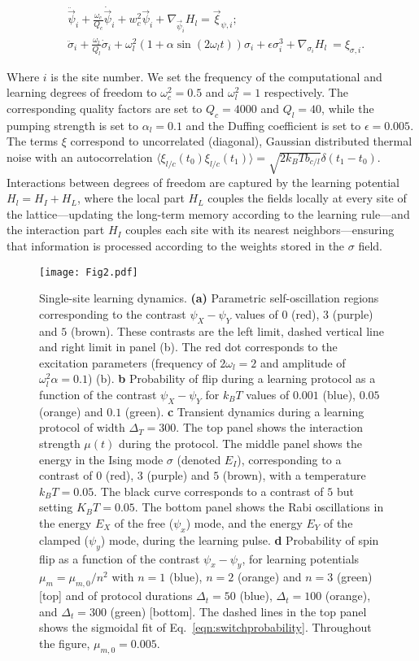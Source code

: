 \begin{align}
&\ddot{\vec{\psi}}_{i} + \frac{\omega_c}{Q_c}\dot{\vec{\psi}}_{i} + w_c^2\vec{\psi}_{i} + \nabla_{\vec{\psi}_i} H_l = \vec{\xi}_{\psi, i};\\
&\ddot{\sigma}_i + \frac{\omega_l}{Q_l}\dot{\sigma}_i + \omega_l^2(1 + \alpha\sin(2\omega_l t))\sigma_i + \epsilon\sigma_i^3 +\nabla_{\sigma_i} H_l \ 
= \xi_{\sigma, i}. \label{eqn:Ising}
\end{align}

Where $i$ is the site number. We set the frequency of the computational and learning degrees of freedom to $\omega_c^2=0.5$ and $\omega_l^2=1$ respectively. The corresponding quality factors are set to $Q_c=4000$ and $Q_l=40$, while the pumping strength is set to $\alpha_l=0.1$ and the Duffing coefficient is set to $\epsilon=0.005$. The terms $\xi$ correspond to uncorrelated (diagonal), Gaussian distributed thermal noise with an autocorrelation $\langle\xi_{l/c}(t_0)\xi_{l/c}(t_1)\rangle = \sqrt{2k_BTb_{c/l}}\delta(t_1-t_0)$. Interactions between degrees of freedom are captured by the learning potential $H_l=H_I+H_L$, where the local part $H_L$ couples the fields locally at every site of the lattice---updating the long-term memory according to the learning rule---and the interaction part $H_I$ couples each site with its nearest neighbors---ensuring that information is processed according to the weights stored in the $\sigma$ field. 

\begin{figure}[t!]
\texttt{[image: Fig2.pdf]}
\caption{\label{fig:flip} Single-site learning dynamics. \textbf{(a)} Parametric self-oscillation regions corresponding to the contrast $\psi_X-\psi_Y$ values of $0$ (red), $3$ (purple) and $5$ (brown). These contrasts are the left limit, dashed vertical line and right limit in panel (b). The red dot corresponds to the excitation parameters (frequency of $2\omega_l=2$ and amplitude of $\omega_l^2\alpha=0.1$) (b). \textbf{b} Probability of flip during a learning protocol as a function of the contrast $\psi_X-\psi_Y$ for $k_BT$ values of $0.001$ (blue), $0.05$ (orange) and $0.1$ (green). \textbf{c} Transient dynamics during a learning protocol of width $\Delta_T=300$. The top panel shows the interaction strength $\mu(t)$ during the protocol. The middle panel shows the energy in the Ising mode $\sigma$ (denoted $E_I$), corresponding to a contrast of $0$ (red), $3$ (purple) and $5$ (brown), with a temperature $k_BT=0.05$. The black curve corresponds to a contrast of $5$ but setting $K_BT=0.05$. The bottom panel shows the Rabi oscillations in the energy $E_X$ of the free ($\psi_x$) mode, and the energy $E_Y$ of the clamped ($\psi_y$) mode, during the learning pulse. \textbf{d} Probability of spin flip as a function of the contrast $\psi_x-\psi_y$, for learning potentials $\mu_m=\mu_{m,0}/n^2$ with $n=1$ (blue), $n=2$ (orange) and $n=3$ (green) [top] and of protocol durations $\Delta_t=50$ (blue), $\Delta_t=100$ (orange), and $\Delta_t=300$ (green) [bottom]. The dashed lines in the top panel shows the sigmoidal fit of Eq.~\ref{eqn:switchprobability}. Throughout the figure, $\mu_{m,0}=0.005$.} 
\vspace{-15pt}
\end{figure}


